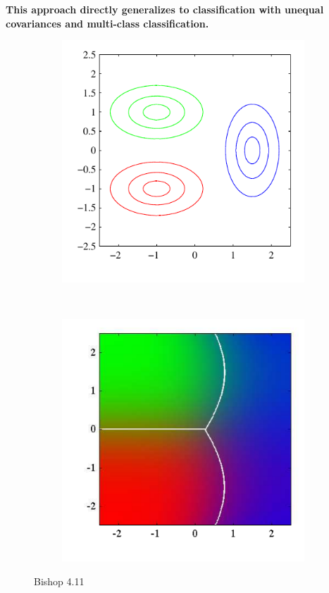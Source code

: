 \textbf{This approach directly generalizes to classification with unequal covariances and multi-class classification.}

\begin{figure}
	\centering
	\begin{subfigure}[b]{0.45\textwidth}
		\includegraphics[width=\textwidth]{./lecture6/Figure411a.pdf}
	\end{subfigure}
	~
	\begin{subfigure}[b]{0.45\textwidth}
		\includegraphics[width=\textwidth]{./lecture6/Figure411b.pdf}
	\end{subfigure}
	\caption{Bishop 4.11}
\end{figure}


